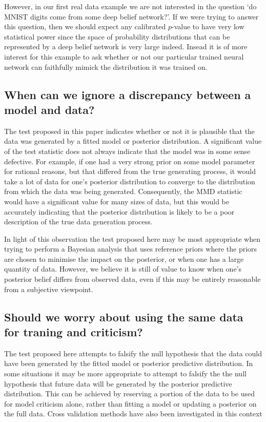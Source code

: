\documentclass{article} %
\begin{document}
However, in our first real data example we are not interested in the question `do MNIST digits come from some deep belief network?'.
If we were trying to answer this question, then we should expect any calibrated $p$-value to have very low statistical power since the space of probability distributions that can be represented by a deep belief network is very large indeed.
Insead it is of more interest for this example to ask whether or not our particular trained neural network can faithfully mimick the distribution it was trained on.

\subsection{When can we ignore a discrepancy between a model and data?}


The test proposed in this paper indicates whether or not it is plausible that the data was generated by a fitted model or posterior distribution.
A significant value of the test statistic does not always indicate that the model was in some sense defective.
For example, if one had a very strong prior on some model parameter for rational reasons, but that differed from the true generating process, it would take a lot of data for one's posterior distribution to converge to the distribution from which the data was being generated.
Consequently, the MMD statistic would have a significant value for many sizes of data, but this would be accurately indicating that the posterior distribution is likely to be a poor description of the true data generation process.

In light of this observation the test proposed here may be most appropriate when trying to perform a Bayesian analysis that uses reference priors where the priors are chosen to minimise the impact on the posterior, or when one has a large quantity of data.
However, we believe it is still of value to know when one's posterior belief differs from observed data, even if this may be entirely reasonable from a subjective viewpoint.

\subsection{Should we worry about using the same data for traning and criticism?}

The test proposed here attempts to falsify the null hypothesis that the data could have been generated by the fitted model or posterior predictive distribution.
In some situations it may be more appropriate to attempt to falsify the the null hypothesis that future data will be generated by the posterior predictive distribution.
This can be achieved by reserving a portion of the data to be used for model criticism alone, rather than fitting a model or updating a posterior on the full data.
Cross validation methods have also been investigated in this context \citep{Gelfand1992-ow, Gelfand1996-vy, Marshall2007-hd}
\end{document}
